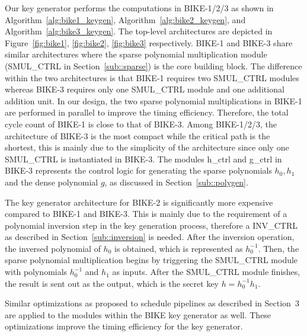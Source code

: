 \documentclass[runningheads]{llncs}
\begin{document}
Our key generator performs the computations in BIKE-1/2/3 as shown in Algorithm~\ref{alg:bike1_keygen}, Algorithm~\ref{alg:bike2_keygen}, and Algorithm~\ref{alg:bike3_keygen}. The top-level architectures are depicted in Figure~\ref{fig:bike1}, \ref{fig:bike2}, \ref{fig:bike3}
respectively.
BIKE-1 and BIKE-3 share similar architectures
where the sparse polynomial multiplication module
(SMUL\_CTRL in Section~\ref{sub::sparse}) is the core building block.
The difference within the two architectures is that
BIKE-1 requires two SMUL\_CTRL modules
whereas BIKE-3 requires only one SMUL\_CTRL module and one additional
addition unit.
In our design, the two sparse polynomial multiplications
in BIKE-1 are performed in parallel to improve the
timing efficiency.
Therefore, the total cycle count of BIKE-1
is close to that of BIKE-3.
Among BIKE-1/2/3, the architecture of BIKE-3 is
the most compact while the critical path is the shortest,
this is mainly due to the simplicity of the architecture
since only one SMUL\_CTRL is instantiated in BIKE-3.
The modules h\_ctrl and g\_ctrl in BIKE-3 represents the
control logic for
generating the sparse polynomials $h_0,h_1$ and
the dense polynomial $g$, as discussed in Section~\ref{sub::polygen}.

The key generator architecture for BIKE-2
is significantly more expensive compared to
BIKE-1 and BIKE-3.
This is mainly due to the requirement of a
polynomial inversion step in the key generation process,
therefore a INV\_CTRL as described in Section~\ref{sub::inversion} is needed.
After the inversion operation, the inversed polynomial of
$h_0$ is obtained, which is represented as $h_0^{-1}$.
Then, the sparse polynomial multiplication begins
by triggering the SMUL\_CTRL module with polynomials
$h_0^{-1}$ and $h_1$ as inputs.
After the SMUL\_CTRL module finishes,
the result is sent out as the output,
which is the secret key $h=h_0^{-1}h_1$.

Similar optimizations as proposed to schedule pipelines
as described in Section~3 are applied to the
modules within the BIKE key generator as well.
These optimizations improve the timing efficiency for the
key generator.
\end{document}
